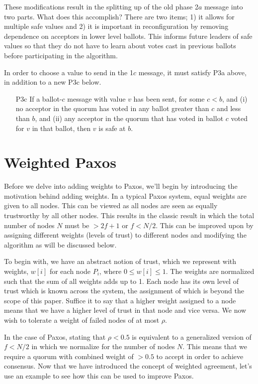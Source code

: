 \documentclass[conference]{IEEEtran}
\begin{document}
These modifications result in the splitting up of the old phase 2$a$ message into two parts. What does this accomplish? There are two items; 1) it allows for multiple safe values and 2) it is important in reconfiguration by removing dependence on acceptors in lower level ballots. This informs future leaders of safe values so that they do not have to learn about votes cast in previous ballots before participating in the algorithm.

In order to choose a value to send in the 1$c$ message, it must satisfy P3a above, in addition to a new P3c below.
\smallskip
\begin{enumerate}[leftmargin=4em]
\item[P3c] If a ballot-$c$ message with value $v$ has been sent, for some $c < b$, and (i) no acceptor in the quorum has voted in any ballot greater than $c$ and less than $b$, and (ii) any acceptor in the quorum that has voted in ballot $c$ voted for $v$ in that ballot, then $v$ is safe at $b$.
\end{enumerate}
\smallskip

\section{Weighted Paxos}
Before we delve into adding weights to Paxos, we'll begin by introducing the motivation behind adding weights. In a typical Paxos system, equal weights are given to all nodes. This can be viewed as all nodes are seen as equally trustworthy by all other nodes. This results in the classic result in which the total number of nodes $N$ must be $> 2f + 1$ or $f < N/2$. This can be improved upon by assigning different weights (levels of trust) to different nodes and modifying the algorithm as will be discussed below.

To begin with, we have an abstract notion of trust, which we represent with weights, $w[i]$ for each node $P_i$, where $0 \leq w[i] \leq 1$. The weights are normalized such that the sum of all weights adds up to 1. Each node has its own level of trust which is known across the system, the assignment of which is beyond the scope of this paper. Suffice it to say that a higher weight assigned to a node means that we have a higher level of trust in that node and vice versa. We now wish to tolerate a weight of failed nodes of at most $\rho$.

In the case of Paxos, stating that $\rho < 0.5$ is equivalent to a generalized version of $f < N/2$ in which we normalize for the number of nodes $N$. This means that we require a quorum with combined weight of $> 0.5$ to accept in order to achieve consensus. Now that we have introduced the concept of weighted agreement, let's use an example to see how this can be used to improve Paxos.
\end{document}
